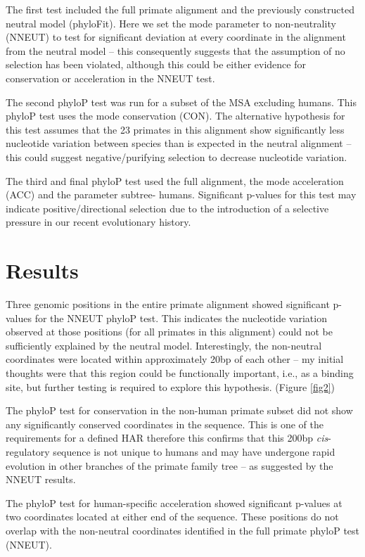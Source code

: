 \documentclass{article}[12pt]
\begin{document}
The first test included the full primate alignment and the previously constructed neutral model (phyloFit). Here we set the mode parameter to non-neutrality (NNEUT) to test for significant deviation at every coordinate in the alignment from the neutral model – this consequently suggests that the assumption of no selection has been violated, although this could be either evidence for conservation or acceleration in the NNEUT test.

The second phyloP test was run for a subset of the MSA excluding humans. This phyloP test uses the mode conservation (CON). The alternative hypothesis for this test assumes that the 23 primates in this alignment show significantly less nucleotide variation between species than is expected in the neutral alignment – this could suggest negative/purifying selection to decrease nucleotide variation.

The third and final phyloP test used the full alignment, the mode acceleration (ACC) and the parameter subtree- humans. Significant p-values for this test may indicate positive/directional selection due to the introduction of a selective pressure in our recent evolutionary history.

\section*{Results}
 
Three genomic positions in the entire primate alignment showed significant p-values for the NNEUT phyloP test. This indicates the nucleotide variation observed at those positions (for all primates in this alignment) could not be sufficiently explained by the neutral model. Interestingly, the non-neutral coordinates were located within approximately 20bp of each other – my initial thoughts were that this region could be functionally important, i.e., as a binding site, but further testing is required to explore this hypothesis. (Figure \ref{fig2})

The phyloP test for conservation in the non-human primate subset did not show any significantly conserved coordinates in the sequence. This is one of the requirements for a defined \Gls{HAR} therefore this confirms that this 200bp \emph{cis}-regulatory sequence is not unique to humans and may have undergone rapid evolution in other branches of the primate family tree – as suggested by the NNEUT results.

The phyloP test for human-specific acceleration showed significant p-values at two coordinates located at either end of the sequence. These positions do not overlap with the non-neutral coordinates identified in the full primate phyloP test (NNEUT). 
\end{document}
